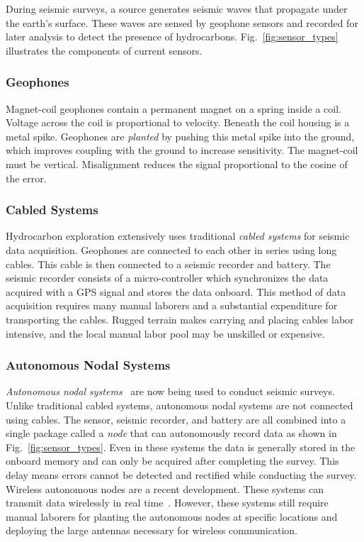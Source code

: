 During seismic surveys, a source generates seismic waves that propagate under the earth's surface. 
These waves are sensed by geophone sensors and recorded for later analysis to detect the presence of hydrocarbons. 
Fig.~\ref{fig:sensor_types} illustrates the components of current sensors. 

\subsubsection{Geophones}
Magnet-coil geophones contain a permanent magnet on a spring inside a coil. Voltage across the coil is proportional to velocity. 
 Beneath the coil housing is a metal spike. 
  Geophones are \emph{planted} by pushing this metal spike into the ground, which improves coupling with the ground to increase sensitivity. 
 The magnet-coil must be vertical. 
  Misalignment reduces the signal proportional to the cosine of the error.


\subsubsection{Cabled Systems}
Hydrocarbon exploration extensively uses traditional \emph{cabled systems} for seismic data acquisition.
   Geophones are connected to each other in series using long cables. This cable is then connected to a seismic recorder and battery. 
    The seismic recorder consists of a micro-controller which synchronizes the data acquired with a GPS signal and stores the data onboard. 
 This method of data acquisition requires many manual laborers and a substantial expenditure for transporting the cables. 
 Rugged terrain makes carrying and placing cables labor intensive, and the local manual labor pool may be unskilled or expensive.
   
 \subsubsection{Autonomous Nodal Systems}
  \emph{Autonomous nodal systems}~\cite{wood1998distributed} are now being used to conduct seismic surveys. Unlike traditional cabled systems, autonomous nodal systems are not connected using cables. The sensor, seismic recorder, and battery are all combined into a single package called a \emph{node} that can autonomously record data as shown in Fig.~\ref{fig:sensor_types}. Even in these systems the data is generally stored in the onboard memory and can only be acquired after completing the survey. This delay means errors cannot be detected and rectified while conducting the survey. 
  Wireless autonomous nodes are a recent development. These systems can transmit data wirelessly in real time~\cite{jiang2015geophysical}. However, these systems still require manual laborers for planting the autonomous nodes at specific locations and deploying the large antennas necessary for wireless communication.
 
